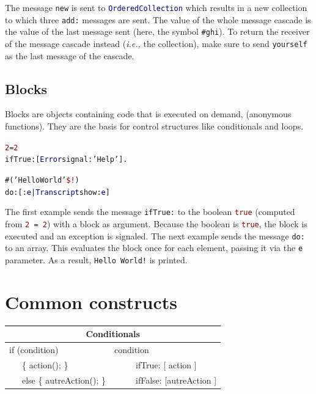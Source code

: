 \documentclass[notumble]{leaflet}
\makeatletter
\newcommand{\ie}{\emph{i.e.,}\xspace}
\newenvironment{displaycode}{%
     \par
     \hspace{1.5em}\begin{minipage}{\linewidth}
       \begin{alltt}\small}{
       \end{alltt}
     \end{minipage}
     \par}
\newcommand{\code}[1]{\foreignlanguage{english}{\texttt{#1}}}
\makeatother
\begin{document}
The message \code{new} is sent to \code{\textcolor{darkBlue}{OrderedCollection}} which
results in a new collection to which three
\code{add:} messages are sent. The value of the whole message cascade
is the value of the last message sent (here, the symbol
\textcolor{string}{\code{\#ghi}}). To return the receiver of the
message cascade instead (\ie the collection), make sure to send
\code{yourself} as the last message of the cascade.

\subsection{Blocks}

Blocks are objects containing code that is executed on demand,
(anonymous functions). They are the basis for control structures like
conditionals and loops.

\begin{displaycode}
\textcolor{darkRed}{2} = \textcolor{darkRed}{2}
  ifTrue: [\textcolor{darkBlue}{Error} signal: \textcolor{string}{'Help'}].
  
\#(\textcolor{string}{'Hello World'} \textcolor{darkRed}{\$!})
  do: [:\textcolor{darkBlue}{e} | \textcolor{darkBlue}{Transcript} show: \textcolor{darkBlue}{e}]
\end{displaycode}

The first example sends the message \code{ifTrue:} to the boolean
\textcolor{darkRed}{\code{true}} (computed from
\code{\textcolor{darkRed}{2} = \textcolor{darkRed}{2}}) with a block
as argument. Because the boolean is \textcolor{darkRed}{\code{true}},
the block is executed and an exception is signaled. The next example
sends the message \code{do:} to an array. This evaluates the block
once for each element, passing it via the \code{e} parameter. As a
result, \code{\textcolor{string}{Hello~World!}} is printed.



\section{Common constructs}

\noindent
\begin{tabularx}{\linewidth}{@{}lX@{}}
        \toprule
        \multicolumn{2}{c}{Conditionals}\\
        \midrule
        if (condition) & condition \\
      \ \ \   \{ action(); \} &   \ \ \ \ \    ifTrue: [ action ] \\
      \ \ \     else \{ autreAction(); \}&\ \ \ \ \  ifFalse: [autreAction ]
\end{tabularx}
\end{document}
